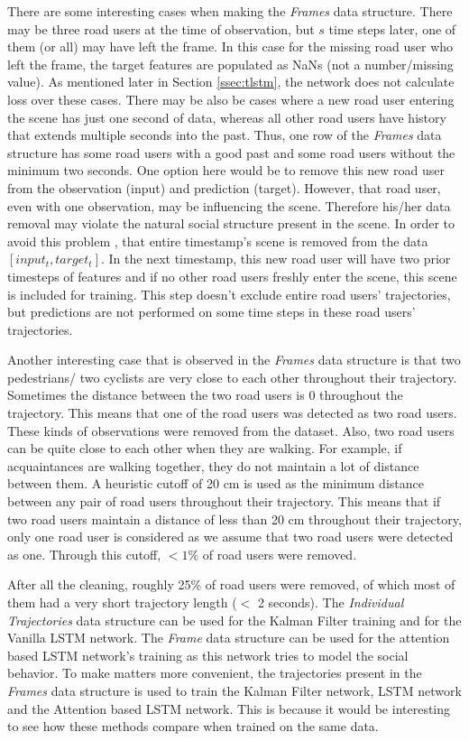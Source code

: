 \documentclass{article}
\begin{document}
There are some interesting cases when making the \textit{Frames} data structure. There may be three road users at the time of observation, but $s$ time steps later, one of them (or all) may have left the frame. In this case for the missing road user who left the frame, the target features are populated as NaNs (not a number/missing value). As mentioned later in Section \ref{ssec:tlstm}, the network does not calculate loss over these cases. There may be also be cases where a new road user entering the scene has just one second of data, whereas all other road users have history that extends multiple seconds into the past. Thus, one row of the \textit{Frames} data structure has some road users with a good past and some road users without the minimum two seconds.  One option here would be to remove this new road user from the observation (input) and prediction (target). However, that road user, even with one observation, may be influencing the scene. Therefore his/her data removal may violate the natural social structure present in the scene. In order to avoid this problem , that entire timestamp's scene is removed from the data $[input_t,target_t]$. In the next timestamp, this new road user will have two prior timesteps of features and if no other road users freshly enter the scene, this scene is included for training. This step doesn't exclude entire road users' trajectories, but predictions are not performed on some time steps in these road users' trajectories. 

Another interesting case that is observed in the \textit{Frames} data structure is that two pedestrians/ two cyclists are very close to each other throughout their trajectory. Sometimes the distance between the two road users is 0 throughout the trajectory. This means that one of the road users was detected as two road users. These kinds of observations were removed from the dataset. Also, two road users can be quite close to each other when they are walking. For example, if acquaintances are walking together, they do not maintain a lot of distance between them. A heuristic cutoff of 20 cm is used as the minimum distance between any pair of road users throughout their trajectory. This means that if two road users maintain a distance of less than 20 cm throughout their trajectory, only one road user is considered as we assume that two road users were detected as one. Through this cutoff, $<1\%$ of road users were removed. 

After all the cleaning, roughly 25\% of road users were removed, of which most of them had a very short trajectory length ($<$ 2 seconds).  The \textit{Individual Trajectories} data structure can be used for the Kalman Filter training and for the Vanilla LSTM network. The \textit{Frame} data structure can be used for the attention based LSTM network's training as this network tries to model the social behavior. To make matters more convenient, the trajectories present in the \textit{Frames} data structure is used to train the Kalman Filter network, LSTM network and the Attention based LSTM network. This is because it would be interesting to see how these methods compare when trained on the same data.
\end{document}
